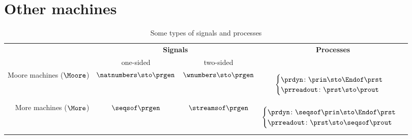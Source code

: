 

\section{Other machines}


\begin{table*}[b]
    \caption{Some types of signals and processes}
    \label{tab:processes-types}
    \begin{tabular}{rccc}
        & \multicolumn{2}{c}{\textbf{Signals}} & \textbf{Processes} \\
        & \rule{0pt}{10pt} one-sided & two-sided & \\
        Moore machines ($\Moore$) &
        $\natnumbers \sto \prgen$
        &
        $\wnumbers \sto \prgen$
        &
        \begin{minipage}{4cm}
            \raggedright
            \begin{equation*}
                \begin{cases}
                    \prdyn \colon \prin \sto \Endof \prst \\
                    \prreadout \colon \prst \sto \prout
                \end{cases}
            \end{equation*}
        \end{minipage}
        \\

        More machines ($\More$) & $\seqsof \prgen$ & $\streamsof \prgen$
        &
        \begin{minipage}{4cm}
            \raggedright
            \begin{equation*}
                \begin{cases}
                    \prdyn \colon \seqsof \prin \sto \Endof \prst \\
                    \prreadout \colon \prst \sto \seqsof \prout
                \end{cases}
            \end{equation*}


\end{minipage}
\end{tabular}
\end{table*}
